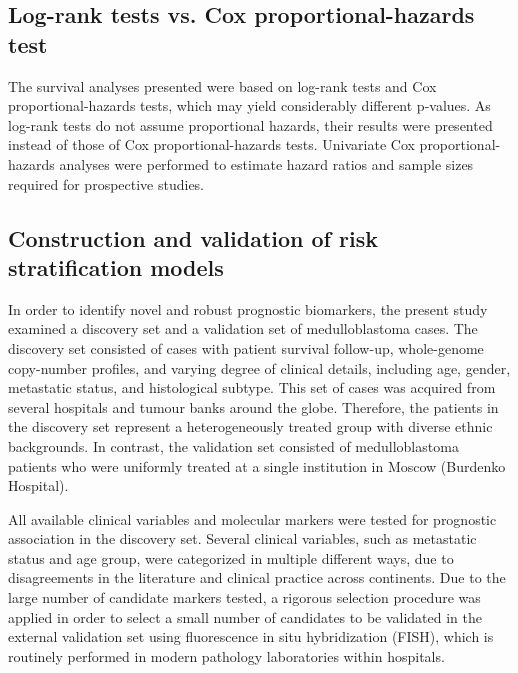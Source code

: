 \subsection{Log-rank tests vs. Cox proportional-hazards test}

The survival analyses presented were based on log-rank tests and Cox proportional-hazards tests, which may yield considerably different p-values. As log-rank tests do not assume proportional hazards, their results were presented instead of those of Cox proportional-hazards tests. Univariate Cox proportional-hazards analyses were performed to estimate hazard ratios and sample sizes required for prospective studies.

\subsection{Construction and validation of risk stratification models}

In order to identify novel and robust prognostic biomarkers, the present study examined a discovery set and a validation set of medulloblastoma cases. The discovery set consisted of cases with patient survival follow-up, whole-genome copy-number profiles, and varying degree of clinical details, including age, gender, metastatic status, and histological subtype. This set of cases was acquired from several hospitals and tumour banks around the globe. Therefore, the patients in the discovery set represent a heterogeneously treated group with diverse ethnic backgrounds. In contrast, the validation set consisted of medulloblastoma patients who were uniformly treated at a single institution in Moscow (Burdenko Hospital).

All available clinical variables and molecular markers were tested for prognostic association in the discovery set. Several clinical variables, such as metastatic status and age group, were categorized in multiple different ways, due to disagreements in the literature and clinical practice across continents. Due to the large number of candidate markers tested, a rigorous selection procedure was applied in order to select a small number of candidates to be validated in the external validation set using fluorescence in situ hybridization (FISH), which is routinely performed in modern pathology laboratories within hospitals.

